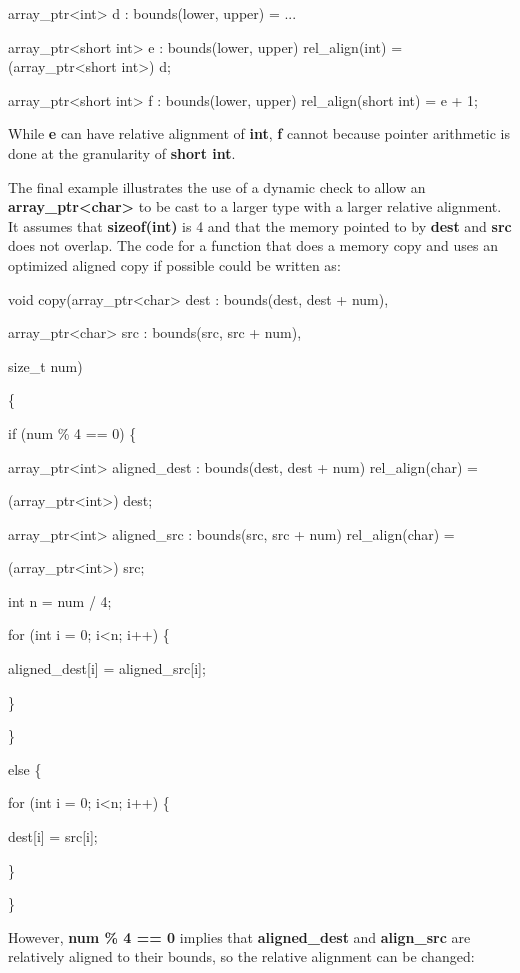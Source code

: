 \documentclass[]{article}
\begin{document}
array\_ptr\textless{}int\textgreater{} d : bounds(lower, upper) = ...

array\_ptr\textless{}short int\textgreater{} e : bounds(lower, upper)
rel\_align(int) = (array\_ptr\textless{}short int\textgreater{}) d;

array\_ptr\textless{}short int\textgreater{} f : bounds(lower, upper)
rel\_align(short int) = e + 1;

While \textbf{e} can have relative alignment of \textbf{int}, \textbf{f}
cannot because pointer arithmetic is done at the granularity of
\textbf{short int}.

The final example illustrates the use of a dynamic check to allow an
\textbf{array\_ptr\textless{}char\textgreater{}} to be cast to a larger
type with a larger relative alignment. It assumes that
\textbf{sizeof(int)} is 4 and that the memory pointed to by
\textbf{dest} and \textbf{src} does not overlap. The code for a function
that does a memory copy and uses an optimized aligned copy if possible
could be written as:

void copy(array\_ptr\textless{}char\textgreater{} dest : bounds(dest,
dest + num),

array\_ptr\textless{}char\textgreater{} src : bounds(src, src + num),

size\_t num)

\{

if (num \% 4 == 0) \{

array\_ptr\textless{}int\textgreater{} aligned\_dest : bounds(dest, dest
+ num) rel\_align(char) =

(array\_ptr\textless{}int\textgreater{}) dest;

array\_ptr\textless{}int\textgreater{} aligned\_src : bounds(src, src +
num) rel\_align(char) =

(array\_ptr\textless{}int\textgreater{}) src;

int n = num / 4;

for (int i = 0; i\textless{}n; i++) \{

aligned\_dest{[}i{]} = aligned\_src{[}i{]};

\}

\}

else \{

for (int i = 0; i\textless{}n; i++) \{

dest{[}i{]} = src{[}i{]};

\}

\}

However, \textbf{num \% 4 == 0} implies that \textbf{aligned\_dest} and
\textbf{align\_src} are relatively aligned to their bounds, so the
relative alignment can be changed:
\end{document}
